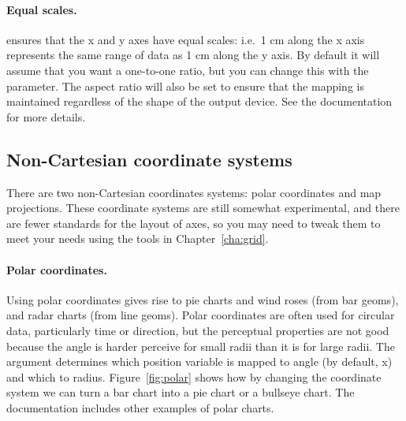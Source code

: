\paragraph{Equal scales.}   ensures that the x and y axes have equal scales: i.e.\ 1 cm along the x axis represents the same range of data as 1 cm along the y axis.  By default it will assume that you want a one-to-one ratio, but you can change this with the  parameter.  The aspect ratio will also be set to ensure that the mapping is maintained regardless of the shape of the output device.  See the documentation for more details.

\subsection{Non-Cartesian coordinate systems}

There are two non-Cartesian coordinates systems: polar coordinates and map projections.  These coordinate systems are still somewhat experimental, and there are fewer standards for the layout of axes, so you may need to tweak them to meet your needs using the tools in Chapter~\ref{cha:grid}.

\paragraph{Polar coordinates.}  Using polar coordinates gives rise to pie charts and wind roses (from bar geoms), and radar charts (from line geoms).  Polar coordinates are often used for circular data, particularly time or direction, but the perceptual properties are not good because the angle is harder perceive for small radii than it is for large radii.  The  argument determines which position variable is mapped to angle (by default, x) and which to radius.  Figure~\ref{fig:polar} shows how by changing the coordinate system we can turn a bar chart into a pie chart or a bullseye chart.  The documentation includes other examples of polar charts.

% 
%


